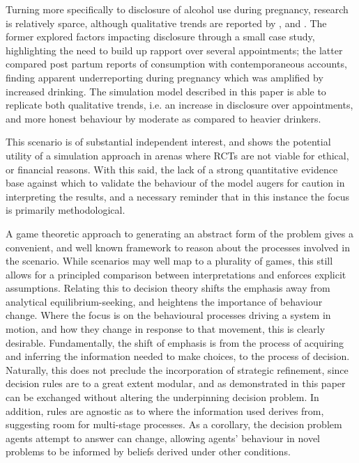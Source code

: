 Turning more specifically to disclosure of alcohol use during pregnancy, research is relatively sparce, although qualitative trends are reported by \citet{Phillips2007}, and \citet{Alvik2006}. The former explored factors impacting disclosure through a small case study, highlighting the need to build up rapport over several appointments; the latter compared post partum reports of consumption with contemporaneous accounts, finding apparent underreporting during pregnancy which was amplified by increased drinking. The simulation model described in this paper is able to replicate both qualitative trends, i.e. an increase in disclosure over appointments, and more honest behaviour by moderate as compared to heavier drinkers.

This scenario is of substantial independent interest, and shows the potential utility of a simulation approach in arenas where \acp{RCT} are not viable for ethical, or financial reasons. With this said, the lack of a strong quantitative evidence base against which to validate the behaviour of the model augers for caution in interpreting the results, and a necessary reminder that in this instance the focus is primarily methodological.


A game theoretic approach to generating an abstract form of the problem gives a convenient, and well known framework to reason about the processes involved in the scenario. While scenarios may well map to a plurality of games, this still allows for a principled comparison between interpretations and enforces explicit assumptions. Relating this to decision theory shifts the emphasis away from analytical equilibrium-seeking, and heightens the importance of behaviour change. Where the focus is on the behavioural processes driving a system in motion, and how they change in response to that movement, this is clearly desirable.
Fundamentally, the shift of emphasis is from the process of acquiring and inferring the information needed to make choices, to the process of decision.
Naturally, this does not preclude the incorporation of strategic refinement, since decision rules are to a great extent modular, and as demonstrated in this paper can be exchanged without altering the underpinning decision problem. In addition, rules are agnostic as to where the information used derives from, suggesting room for multi-stage processes.  As a corollary, the decision problem agents attempt to answer can change, allowing agents' behaviour in novel problems to be informed by beliefs derived under other conditions. 

